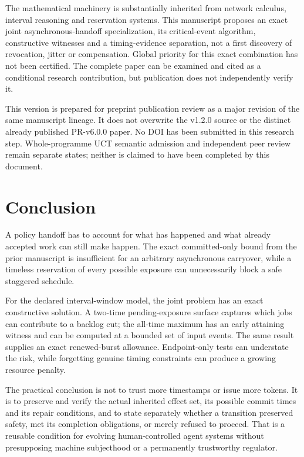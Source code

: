 The mathematical machinery is substantially inherited from network calculus, interval reasoning and reservation systems. This manuscript proposes an exact joint asynchronous-handoff specialization, its critical-event algorithm, constructive witnesses and a timing-evidence separation, not a first discovery of revocation, jitter or compensation. Global priority for this exact combination has not been certified. The complete paper can be examined and cited as a conditional research contribution, but publication does not independently verify it.

This version is prepared for preprint publication review as a major revision of the same manuscript lineage. It does not overwrite the v1.2.0 source or the distinct already published PR-v6.0.0 paper. No DOI has been submitted in this research step. Whole-programme UCT semantic admission and independent peer review remain separate states; neither is claimed to have been completed by this document.

\section{Conclusion}
A policy handoff has to account for what has happened and what already accepted work can still make happen. The exact committed-only bound from the prior manuscript is insufficient for an arbitrary asynchronous carryover, while a timeless reservation of every possible exposure can unnecessarily block a safe staggered schedule.

For the declared interval-window model, the joint problem has an exact constructive solution. A two-time pending-exposure surface captures which jobs can contribute to a backlog cut; the all-time maximum has an early attaining witness and can be computed at a bounded set of input events. The same result supplies an exact renewed-burst allowance. Endpoint-only tests can understate the risk, while forgetting genuine timing constraints can produce a growing resource penalty.

The practical conclusion is not to trust more timestamps or issue more tokens. It is to preserve and verify the actual inherited effect set, its possible commit times and its repair conditions, and to state separately whether a transition preserved safety, met its completion obligations, or merely refused to proceed. That is a reusable condition for evolving human-controlled agent systems without presupposing machine subjecthood or a permanently trustworthy regulator.

